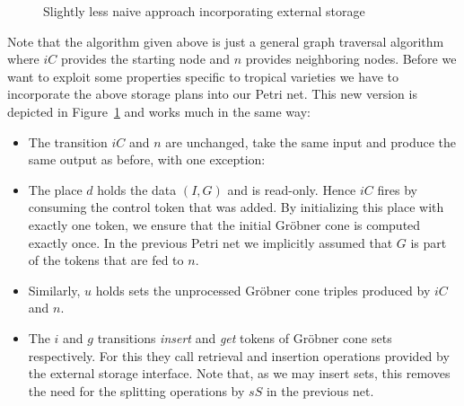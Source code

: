 \documentclass[
  paper=a4,
  titlepage,
  bibliography=totoc,
  listof=totoc,
  pagesize=pdftex
]{scrartcl}
\numberwithin{figure}{section}
\numberwithin{equation}{section}
\numberwithin{table}{section}
\theoremstyle{definition}
\numberwithin{definition}{section}
\begin{document}
\begin{figure}[tbhp]
  \centering
  \caption{Slightly less naive approach incorporating external storage}
  \label{fig:naive:storage}
\end{figure}

Note that the algorithm given above is just a general graph traversal algorithm where $iC$
provides the starting node and $n$ provides neighboring nodes. Before we want to exploit
some properties specific to tropical varieties we have to incorporate the above storage
plans into our Petri net. This new version is depicted in Figure~\ref{fig:naive:storage}
and works much in the same way:
\begin{itemize}
  \item The transition $iC$ and $n$ are unchanged, take the same input and produce the
    same output as before, with one exception:
  \item The place $d$ holds the data $(I, G)$ and is read-only. Hence $iC$ fires by
    consuming the control token that was added. By initializing this place with exactly
    one token, we ensure that the initial Gröbner cone is computed exactly once. In the
    previous Petri net we implicitly assumed that $G$ is part of the tokens that are fed
    to $n$.
  \item Similarly, $u$ holds sets the unprocessed Gröbner cone triples produced by $iC$
    and $n$.
  \item The $i$ and $g$ transitions \emph{insert} and \emph{get} tokens of Gröbner cone
    sets respectively. For this they call retrieval and insertion operations provided by
    the external storage interface. Note that, as we may insert sets, this removes the
    need for the splitting operations by $sS$ in the previous net.
\end{itemize}
\end{document}

